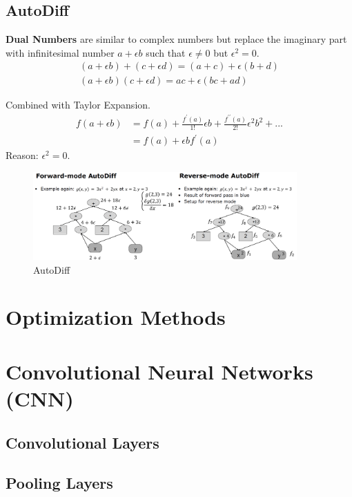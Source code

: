 \documentclass[a4paper]{article}
\begin{document}
\subsection{AutoDiff}

\textbf{Dual Numbers} are similar to complex numbers but replace the imaginary part with infinitesimal number $a + \epsilon b$ such that $\epsilon \neq 0$ but $\epsilon^2 = 0$.
\begin{align}
	(a + \epsilon b) + (c + \epsilon d ) = (a + c ) + \epsilon (b + d) \\
	(a + \epsilon b)(c + \epsilon d ) = ac + \epsilon (bc + ad)
\end{align}

Combined with Taylor Expansion.
\begin{align}
	f(a + \epsilon b) &= f(a) + \frac{f^{\prime} (a)}{1!} \epsilon b + \frac{f^{\prime \prime}(a)}{2!} \epsilon^2 b^2 + ... \\
	&= f(a) + \epsilon b f^{\prime} (a)
\end{align}
Reason: $\epsilon^2 = 0$. 
\begin{figure}[h]
	\centering
	\includegraphics[width=0.9\textwidth]{images/autodiffcombine.png}
	\caption{AutoDiff}
	\label{fig:autodiff}
\end{figure}


\section{Optimization Methods}

\section{Convolutional Neural Networks (CNN)}

\subsection{Convolutional Layers}

\subsection{Pooling Layers}
\end{document}

